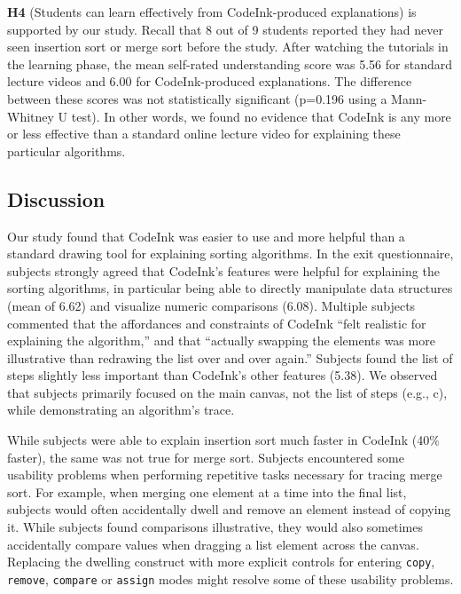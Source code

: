 \textbf{H4} (Students can learn effectively from CodeInk-produced explanations)
is supported by our study. Recall that 8 out of 9 students reported they had
never seen insertion sort or merge sort before the study. After watching the
tutorials in the learning phase, the mean self-rated understanding score was
5.56 for standard lecture videos and 6.00 for CodeInk-produced explanations. The
difference between these scores was not statistically significant (p=0.196 using
a Mann-Whitney U test). In other words, we found no evidence that CodeInk is any
more or less effective than a standard online lecture video for explaining these
particular algorithms.

\subsection{Discussion}

Our study found that CodeInk was easier to use and more helpful than a standard
drawing tool for explaining sorting algorithms. In the exit questionnaire, subjects
strongly agreed that CodeInk's features were helpful for explaining the sorting
algorithms, in particular being able to directly manipulate data structures
(mean of 6.62) and visualize numeric comparisons (6.08). Multiple subjects
commented that the affordances and constraints of CodeInk ``felt realistic for
explaining the algorithm,'' and that ``actually swapping the elements was more
illustrative than redrawing the list over and over again.'' Subjects found the
list of steps slightly less important than CodeInk's other features (5.38). We
observed that subjects primarily focused on the main canvas, not the list of
steps (e.g., c), while demonstrating an algorithm's
trace.

While subjects were able to explain insertion sort much faster in CodeInk (40\%
faster), the same was not true for merge sort.
Subjects encountered some usability problems when performing repetitive tasks
necessary for tracing merge sort. For example, when merging one element at a
time into the final list, subjects would often accidentally dwell and remove an
element instead of copying it. While subjects found comparisons illustrative,
they would also sometimes accidentally compare values when dragging a list
element across the canvas. Replacing the dwelling construct with more explicit
controls for entering \texttt{copy}, \texttt{remove}, \texttt{compare} or
\texttt{assign} modes might resolve some of these usability problems.

